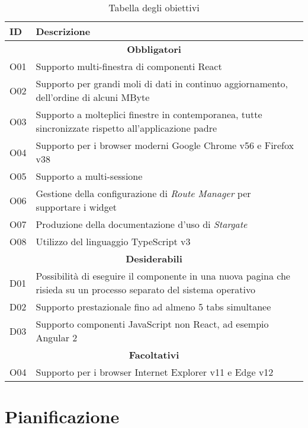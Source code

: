 \begin{table}[H]
\begin{tabular}{ |p{3cm} |p{9cm}|}
\hline
\textbf{ID} & \textbf{Descrizione} \\ \hline

\multicolumn{2}{|c|}{\textbf{Obbligatori}} \\ \hline

O01 & Supporto multi-finestra di componenti React \\ \hline
O02 & Supporto per grandi moli di dati in continuo aggiornamento, dell'ordine di alcuni MByte \\ \hline
O03 & Supporto a molteplici finestre in contemporanea, tutte sincronizzate rispetto all'applicazione padre \\ \hline
O04 & Supporto per i browser moderni Google Chrome v56 e Firefox v38 \\ \hline
O05 & Supporto a multi-sessione \\ \hline
O06 & Gestione della configurazione di \textit{Route Manager} per supportare i widget \\ \hline
O07 & Produzione della documentazione d'uso di \textit{Stargate} \\ \hline
O08 & Utilizzo del linguaggio TypeScript v3 \\ \hline

\multicolumn{2}{|c|}{\textbf{Desiderabili}} \\ \hline

D01 & Possibilità di eseguire il componente in una nuova pagina che risieda su un processo separato del sistema operativo \\ \hline
D02 & Supporto prestazionale fino ad almeno 5 tabs simultanee \\ \hline
D03 & Supporto componenti JavaScript non React, ad esempio Angular 2 \\ \hline

\multicolumn{2}{|c|}{\textbf{Facoltativi}} \\ \hline

O04 & Supporto per i browser Internet Explorer v11 e Edge v12 \\ \hline

\end{tabular}
\caption{Tabella degli obiettivi}
\end{table}

\section{Pianificazione}

